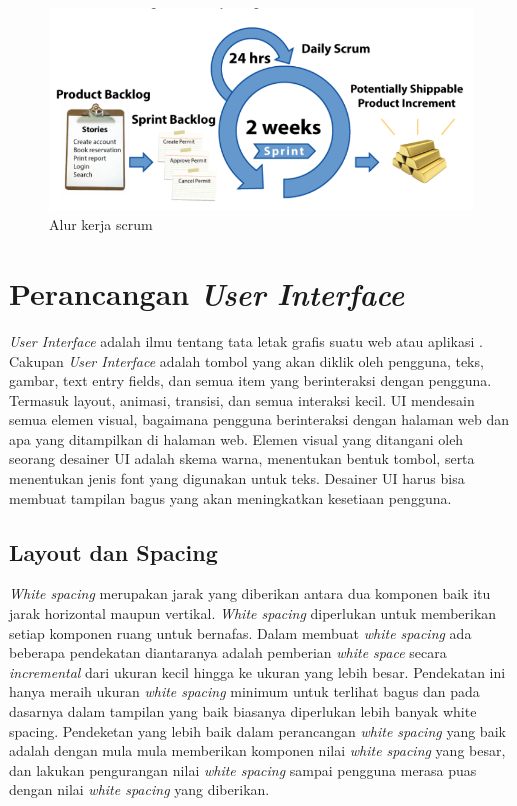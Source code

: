 \begin{figure}[H]
	\centering
	\includegraphics[keepaspectratio, width=12cm]{gambar/scrum-flow}
	\caption{Alur kerja scrum}
	\label{gambar:scrum-flow.png}
\end{figure}


\section{Perancangan \textit{User Interface}}

\textit{User Interface} adalah ilmu tentang tata letak grafis suatu web atau aplikasi \citep{userinterface1}. Cakupan \textit{User Interface} adalah tombol yang akan diklik oleh pengguna, teks, gambar, text entry fields, dan semua item yang berinteraksi dengan pengguna. Termasuk layout, animasi, transisi, dan semua interaksi kecil. UI mendesain semua elemen visual, bagaimana pengguna berinteraksi dengan halaman web dan apa yang ditampilkan di halaman web. Elemen visual yang ditangani oleh seorang desainer UI adalah skema warna, menentukan bentuk tombol, serta menentukan jenis font yang digunakan untuk teks. Desainer UI harus bisa membuat tampilan bagus yang akan meningkatkan kesetiaan pengguna. 
\subsection{Layout dan Spacing}
\textit{White spacing} merupakan jarak yang diberikan antara dua komponen baik itu jarak horizontal maupun vertikal. \textit{White spacing} diperlukan untuk memberikan setiap komponen ruang untuk bernafas. Dalam membuat \textit{white spacing} ada beberapa pendekatan diantaranya adalah pemberian \textit{white space} secara \textit{incremental} dari ukuran kecil hingga ke ukuran yang lebih besar. Pendekatan ini hanya meraih ukuran \textit{white spacing} minimum untuk terlihat bagus dan pada dasarnya dalam tampilan yang baik biasanya diperlukan lebih banyak white spacing. Pendeketan yang lebih baik dalam perancangan \textit{white spacing} yang baik adalah dengan mula mula memberikan komponen nilai \textit{white spacing} yang besar, dan lakukan pengurangan nilai \textit{white spacing} sampai pengguna merasa puas dengan nilai \textit{white spacing} yang diberikan. 


